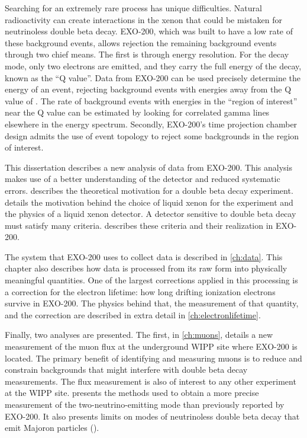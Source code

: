 \documentclass[herrin-thesis.tex]{subfiles}
\begin{document}
Searching for an extremely rare process has unique difficulties. Natural radioactivity can create interactions in the xenon that could be mistaken for neutrinoless double beta decay. EXO-200, which was built to have a low rate of these background events, allows rejection the remaining background events through two chief means. The first is through energy resolution. For the \zeronu{} decay mode, only two electrons are emitted, and they carry the full energy of the decay, known as the ``Q value''. Data from EXO-200 can be used precisely determine the energy of an event, rejecting background events with energies away from the Q value of . The rate of background events with energies in the ``region of interest'' near the Q value can be estimated by looking for correlated gamma lines elsewhere in the energy spectrum. Secondly, EXO-200's time projection chamber design admits the use of event topology to reject some backgrounds in the region of interest.

This dissertation describes a new analysis of data from EXO-200. This analysis makes use of a better understanding of the detector and reduced systematic errors.  describes the theoretical motivation for a double beta decay experiment.  details the motivation behind the choice of liquid xenon for the experiment and the physics of a liquid xenon detector. A detector sensitive to double beta decay must satisfy many criteria.  describes these criteria and their realization in EXO-200.

The system that EXO-200 uses to collect data is described in \cref{ch:data}. This chapter also describes how data is processed from its raw form into physically meaningful quantities. One of the largest corrections applied in this processing is a correction for the electron lifetime: how long drifting ionization electrons survive in EXO-200. The physics behind that, the measurement of that quantity, and the correction are described in extra detail in \cref{ch:electronlifetime}.

Finally, two analyses are presented. The first, in \cref{ch:muons}, details a new measurement of the muon flux at the underground WIPP site where EXO-200 is located. The primary benefit of identifying and measuring muons is to reduce and constrain backgrounds that might interfere with double beta decay measurements. The flux measurement is also of interest to any other experiment at the WIPP site.  presents the methods used to obtain a more precise measurement of the two-neutrino-emitting mode than previously reported by EXO-200. It also presents limits on modes of neutrinoless double beta decay that emit Majoron particles (\zeronuXpX{}).
\end{document}
